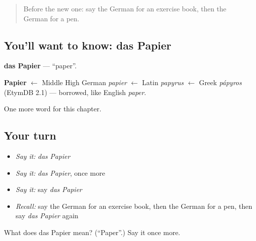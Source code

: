 \label{lesson:GE-C80-papier}



\begin{quote}
Before the new one: say the German for an exercise book, then the German for a pen.
\end{quote}

\subsection*{You'll want to know: das Papier}
\textbf{das Papier} — \textquotedblleft{}paper\textquotedblright{}.

\begin{cousinweb}
\textbf{Papier} $\leftarrow$ Middle High German \emph{papier} $\leftarrow$ Latin \emph{papyrus} $\leftarrow$ Greek \emph{pápyros} (EtymDB 2.1) — borrowed, like English \emph{paper}.
\end{cousinweb}

\begin{grammarlens}[title={What you've built}]
One more word for this chapter.
\end{grammarlens}

\subsection*{Your turn}
\begin{itemize}
\raggedright
  \item \emph{Say it:} \emph{das Papier}
  \item \emph{Say it:} \emph{das Papier}, once more
  \item \emph{Say it:} say \emph{das Papier}
  \item \emph{Recall:} say the German for an exercise book, then the German for a pen, then say \emph{das Papier} again
\end{itemize}

\begin{tcolorbox}[breakable,colback=teal!4,colframe=teal!35!black,title={Before you move on}]
What does das Papier mean? (\textquotedblleft{}Paper\textquotedblright{}.) Say it once more.
\end{tcolorbox}
